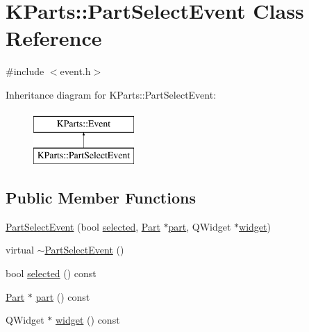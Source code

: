 \hypertarget{classKParts_1_1PartSelectEvent}{\section{\-K\-Parts\-:\-:\-Part\-Select\-Event \-Class \-Reference}
\label{classKParts_1_1PartSelectEvent}
}


{\ttfamily \#include $<$event.\-h$>$}

\-Inheritance diagram for \-K\-Parts\-:\-:\-Part\-Select\-Event\-:\begin{figure}[H]
\begin{center}
\leavevmode
\includegraphics[height=2.000000cm]{classKParts_1_1PartSelectEvent}
\end{center}
\end{figure}
\subsection*{\-Public \-Member \-Functions}
\begin{DoxyCompactItemize}
\item 
\hyperlink{classKParts_1_1PartSelectEvent_ae31a4b63005a8e7493fd4fa5bd6f5e8d}{\-Part\-Select\-Event} (bool \hyperlink{classKParts_1_1PartSelectEvent_afbf342d865c918cdb6b856ab4168145f}{selected}, \hyperlink{classKParts_1_1Part}{\-Part} $\ast$\hyperlink{classKParts_1_1PartSelectEvent_a5e85934aca776852b1e8e25b01160f4e}{part}, \-Q\-Widget $\ast$\hyperlink{classKParts_1_1PartSelectEvent_a4f3b4a8544692181d2b49ffdeaad21d2}{widget})
\item 
virtual \hyperlink{classKParts_1_1PartSelectEvent_a5f1dc2753bd8a6a44a495fd6d505b312}{$\sim$\-Part\-Select\-Event} ()
\item 
bool \hyperlink{classKParts_1_1PartSelectEvent_afbf342d865c918cdb6b856ab4168145f}{selected} () const 
\item 
\hyperlink{classKParts_1_1Part}{\-Part} $\ast$ \hyperlink{classKParts_1_1PartSelectEvent_a5e85934aca776852b1e8e25b01160f4e}{part} () const 
\item 
\-Q\-Widget $\ast$ \hyperlink{classKParts_1_1PartSelectEvent_a4f3b4a8544692181d2b49ffdeaad21d2}{widget} () const 
\end{DoxyCompactItemize}
